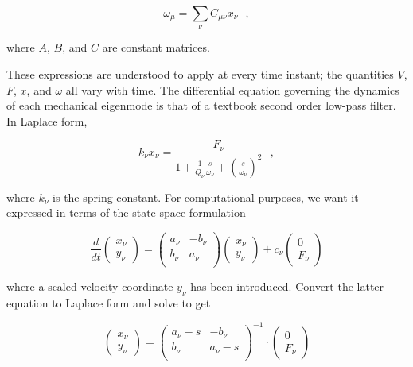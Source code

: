 \documentclass[a4paper,12pt]{article}
\begin{document}
\begin{equation}
\omega_\mu = \sum_\nu C_{\mu\nu} x_\nu~~~,
\end{equation}

\noindent where $A$, $B$, and $C$ are constant matrices.

These expressions are understood to apply at every time instant; the quantities $V$, $F$, $x$, and $\omega$ all vary with time. The differential equation governing the dynamics of each mechanical eigenmode is that of a textbook second order low-pass filter.  In Laplace form,

\begin{equation}
k_\nu x_\nu = \frac{F_\nu}{ \displaystyle 1 + \frac{1}{Q_\nu}\frac{s}{\omega_\nu} + \left(\frac{s}{\omega_\nu}\right)^2}~~~,
\end{equation}

\noindent where $k_\nu$ is the spring constant. For computational purposes, we want it expressed in terms of the state-space formulation

\begin{equation}
\frac{d}{dt} \begin{pmatrix}
              x_{\nu} \\
              y_{\nu}
             \end{pmatrix}
             = \begin{pmatrix}
                a_{\nu} & -b_{\nu} \\
                b_{\nu} & a_{\nu} \\
               \end{pmatrix}
               \begin{pmatrix}
                x_{\nu}\\
                y_{\nu}
               \end{pmatrix}
               +c_{\nu} \begin{pmatrix}
                  0 \\
                  F_{\nu}
                 \end{pmatrix}
\label{eq: state_space}
\end{equation}

\noindent where a scaled velocity coordinate $y_{\nu}$ has been introduced. Convert the latter equation to Laplace form and solve to get

\begin{equation}
  \begin{pmatrix}
    x_{\nu} \\
    y_{\nu}
  \end{pmatrix}
  = 
  \begin{pmatrix}
    a_{\nu}-s& -b_{\nu} \\
    b_{\nu} & a_{\nu}-s \\
   \end{pmatrix}^{-1}
   \cdot
   \begin{pmatrix}
     0 \\
     F_{\nu}
  \end{pmatrix}
\end{equation}
\end{document}
